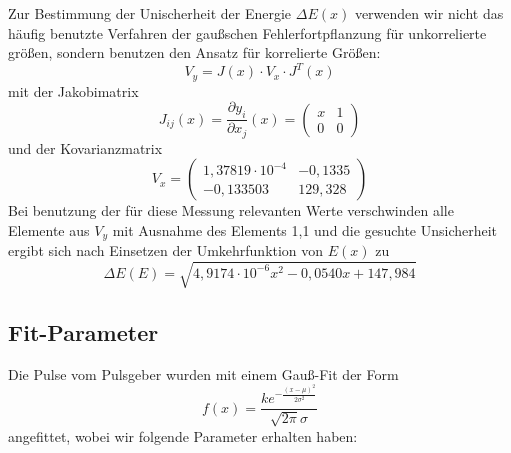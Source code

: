 \documentclass[bigchapter,colorback,accentcolor=tud4b,linedtoc,11pt]{tudreport}
\begin{document}
\color{blue}
Zur Bestimmung der Unischerheit der Energie $\Delta E(x)$ verwenden wir nicht
das häufig benutzte Verfahren der gaußschen Fehlerfortpflanzung für
unkorrelierte größen, sondern benutzen den Ansatz für korrelierte Größen:
$$V_y=J(x) \cdot V_x \cdot J^T(x)$$\cite{Fehler}
mit der Jakobimatrix 
$$J_{ij}(x) = \frac{\partial y_i}{\partial x_j}(x) = \begin{pmatrix} x & 1 \\ 0 &
  0 \end{pmatrix}$$
und der Kovarianzmatrix
$$V_x=\begin{pmatrix} 
1,37819 \cdot 10^{-4} & -0,1335 \\
 -0,133503 & 129,328
\end{pmatrix}$$
Bei benutzung der für diese Messung relevanten Werte verschwinden alle Elemente
aus $V_y$ mit Ausnahme des Elements 1,1 und die gesuchte Unsicherheit ergibt
sich nach Einsetzen der Umkehrfunktion von $E(x)$ zu $$\Delta E(E)=\sqrt{4,9174 \cdot 10^{-6} x^2 - 0,0540x + 147,984}$$

\begin{figure}[H]
\end{figure}

\color{black}

\subsection{Fit-Parameter}
Die Pulse vom Pulsgeber wurden mit einem Gauß-Fit der Form 
$$f(x)=\frac{k e^{-\frac{(x-\mu )^2}{2 \sigma ^2}}}{\sqrt{2 \pi } \sigma }$$
angefittet, wobei wir folgende Parameter erhalten haben:
\end{document}
